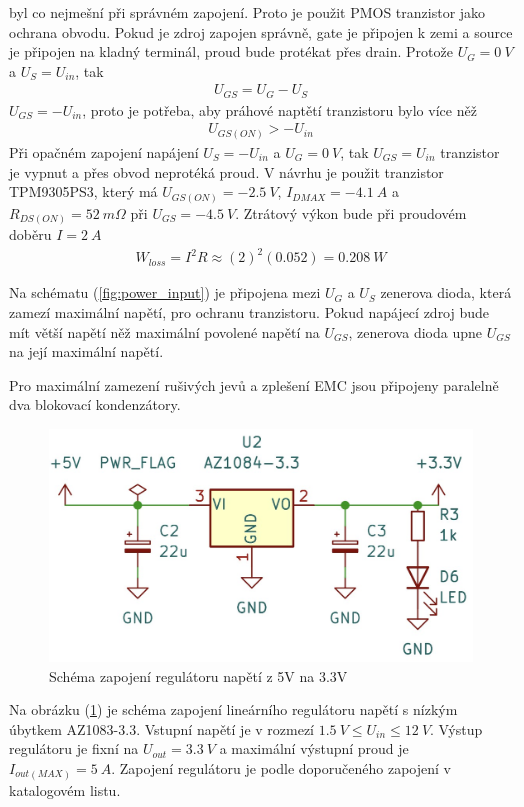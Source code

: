 byl co nejmešní při správném zapojení. Proto je použit PMOS tranzistor jako ochrana obvodu. Pokud je zdroj zapojen správně, gate je připojen k zemi a source je připojen na kladný terminál, proud bude protékat přes drain. Protože $ U_G = 0 \ V$ a $U_S = U_{in}$, tak
\begin{align*}
    U_{GS} = U_G - U_S
\end{align*}
$U_{GS} = -U_{in} $, proto je potřeba, aby práhové naptětí tranzistoru bylo více něž
\begin{align*}
    U_{GS(ON)} > -U_{in}
\end{align*}
Při opačném zapojení napájení $U_S = -U_{in}$ a $ U_G = 0 \ V$, tak  $U_{GS} = U_{in}$ tranzistor je vypnut a přes obvod neprotéká proud.
V návrhu je použit tranzistor TPM9305PS3, který má  $U_{GS(ON)} = -2.5 \ V $,  $I_{D MAX} = -4.1 \ A$ a $R_{DS(ON)} = 52 \ m \Omega$ při $U_{GS} = -4.5 \ V$.
Ztrátový výkon bude při proudovém doběru $I = 2 \ A$
\begin{align*}
    W_{loss} = I^2 R \approx (2)^2 (0.052) =  0.208 \ W
\end{align*}

Na schématu (\ref{fig:power_input}) je připojena mezi $U_G$ a $U_S$ zenerova dioda, která zamezí maximální napětí, pro ochranu tranzistoru. Pokud napájecí zdroj bude mít větší napětí něž maximální povolené napětí na $U_{GS}$, zenerova dioda upne $U_{GS}$ na její maximální napětí.
\par
Pro maximální zamezení rušivých jevů a zplešení EMC jsou připojeny paralelně dva blokovací kondenzátory.

\begin{figure}[H]
    \includegraphics[width=0.9\linewidth]{pictures/ldo_3v3.jpg}
    \caption{Schéma zapojení regulátoru napětí z 5V na 3.3V}
    \label{fig:stepdown}
\end{figure}
Na obrázku (\ref{fig:stepdown}) je schéma zapojení lineárního regulátoru napětí s nízkým úbytkem AZ1083-3.3.
Vstupní napětí je v rozmezí $1.5 \ V \leq U_{in} \leq 12 \ V $. Výstup regulátoru je fixní na $U_{out} = 3.3 \ V$ a maximální výstupní proud je $I_{out(MAX)} = 5 \ A$. Zapojení regulátoru je podle doporučeného zapojení v katalogovém listu.


